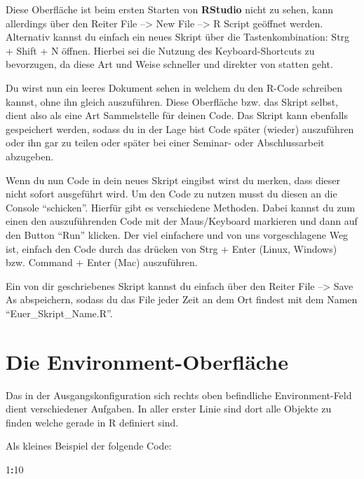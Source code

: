 \documentclass[
]{book}
\newenvironment{Shaded}{\begin{snugshade}}{\end{snugshade}}
\newcommand{\DecValTok}[1]{\textcolor[rgb]{0.00,0.00,0.81}{#1}}
\newcommand{\OperatorTok}[1]{\textcolor[rgb]{0.81,0.36,0.00}{\textbf{#1}}}
\begin{document}
Diese Oberfläche ist beim ersten Starten von \textbf{RStudio} nicht zu sehen, kann allerdings über den Reiter File --\textgreater{} New File --\textgreater{} R Script geöffnet werden. Alternativ kannst du einfach ein neues Skript über die Tastenkombination: Strg + Shift + N öffnen. Hierbei sei die Nutzung des Keyboard-Shortcuts zu bevorzugen, da diese Art und Weise schneller und direkter von statten geht.

Du wirst nun ein leeres Dokument sehen in welchem du den R-Code schreiben kannst, ohne ihn gleich auszuführen. Diese Oberfläche bzw. das Skript selbst, dient also als eine Art Sammelstelle für deinen Code. Das Skript kann ebenfalls gespeichert werden, sodass du in der Lage bist Code später (wieder) auszuführen oder ihn gar zu teilen oder später bei einer Seminar- oder Abschlussarbeit abzugeben.

Wenn du nun Code in dein neues Skript eingibst wirst du merken, dass dieser nicht sofort ausgeführt wird. Um den Code zu nutzen musst du diesen an die Console ``schicken''. Hierfür gibt es verschiedene Methoden. Dabei kannst du zum einen den auszuführenden Code mit der Maus/Keyboard markieren und dann auf den Button ``Run'' klicken. Der viel einfachere und von uns vorgeschlagene Weg ist, einfach den Code durch das drücken von Strg + Enter (Linux, Windows) bzw. Command + Enter (Mac) auszuführen.

Ein von dir geschriebenes Skript kannst du einfach über den Reiter File --\textgreater{} Save As abspeichern, sodass du das File jeder Zeit an dem Ort findest mit dem Namen ``Euer\_Skript\_Name.R''.

\hypertarget{die-environment-oberfluxe4che}{%
\section{Die Environment-Oberfläche}\label{die-environment-oberfluxe4che}}

Das in der Ausgangskonfiguration sich rechts oben befindliche Environment-Feld dient verschiedener Aufgaben. In aller erster Linie sind dort alle Objekte zu finden welche gerade in R definiert sind.

Als kleines Beispiel der folgende Code:

\begin{Shaded}
\begin{Highlighting}[]
\DecValTok{1}\OperatorTok{:}\DecValTok{10}
\end{Highlighting}
\end{Shaded}
\end{document}
